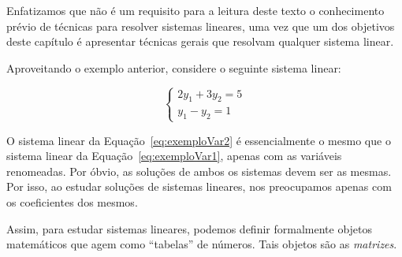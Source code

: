 Enfatizamos que não é um requisito para a leitura deste texto o conhecimento prévio de técnicas para resolver sistemas lineares, uma vez que um dos objetivos deste capítulo é apresentar técnicas gerais que resolvam qualquer sistema linear.

Aproveitando o exemplo anterior, considere o seguinte sistema linear:

    \begin{equation}\label{eq:exemploVar2}
        \begin{cases}
            2y_1 + 3y_2 = 5 \\
            y_1 - y_2 = 1
        \end{cases}
    \end{equation}

O sistema linear da Equação~\eqref{eq:exemploVar2} é essencialmente o mesmo que o sistema linear da Equação~\eqref{eq:exemploVar1}, apenas com as variáveis renomeadas.
Por óbvio, as soluções de ambos os sistemas devem ser as mesmas.
Por isso, ao estudar soluções de sistemas lineares, nos preocupamos apenas com os coeficientes dos mesmos.

Assim, para estudar sistemas lineares, podemos definir formalmente objetos matemáticos que agem como ``tabelas'' de números.
Tais objetos são as \emph{matrizes}.

